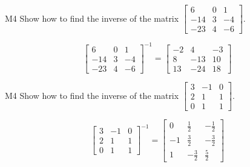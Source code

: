 \begin{problem}{M4}
  Show how to find the inverse of the matrix $\begin{bmatrix} 6 & 0 & 1 \\ -14 & 3 & -4 \\ -23 & 4 & -6\end{bmatrix}$.
\end{problem}
\begin{solution}
$$\begin{bmatrix} 6 & 0 & 1 \\ -14 & 3 & -4 \\ -23 & 4 & -6\end{bmatrix}^{-1} = \begin{bmatrix} -2 & 4 & -3 \\ 8 & -13 & 10 \\ 13 & -24 & 18 \end{bmatrix}$$
\end{solution}

\begin{problem}{M4}
Show how to find the inverse of the matrix $\begin{bmatrix} 3 & -1 & 0  \\ 2 & 1 & 1  \\ 0 & 1 & 1   \end{bmatrix}$.
\end{problem}
\begin{solution}
$$\begin{bmatrix} 3 & -1 & 0  \\ 2 & 1 & 1  \\ 0 & 1 & 1   \end{bmatrix}^{-1} = \begin{bmatrix} 0 & \frac{1}{2} & -\frac{1}{2} \\ -1 & \frac{3}{2} & -\frac{3}{2} \\ 1 & -\frac{3}{2} & \frac{5}{2}\end{bmatrix}$$
\end{solution}



